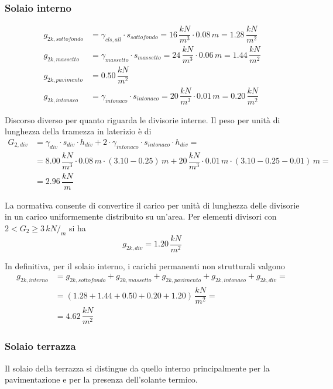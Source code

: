 \subsubsection*{Solaio interno}

\begin{align*}
 g_{2k, sottofondo} &= \gamma_{cls, all}\cdot s_{sottofondo} = 16\,\dfrac{kN}{m^3}\cdot 0.08\,\si{m} = 1.28\,\dfrac{kN}{m^2}\\
 g_{2k, massetto} &= \gamma_{massetto}\cdot
 s_{massetto} = 24\,\dfrac{kN}{m^3}\cdot 0.06\,\si{m} = 1.44\,\dfrac{kN}{m^2}\\
 g_{2k, pavimento} &= 0.50\,\dfrac{kN}{m^2}\\
 g_{2k, intonaco} &= \gamma_{intonaco}\cdot s_{intonaco} = 20\,\dfrac{kN}{m^3}\cdot 0.01\,\si{m} = 0.20\,\dfrac{kN}{m^2}
\end{align*}

Discorso diverso per quanto riguarda le divisorie interne. Il peso per unità di lunghezza della tramezza in laterizio è di 
\begin{align*}
 G_{2, div} &= \gamma_{div} \cdot s_{div} \cdot h_{div} + 2 \cdot \gamma_{intonaco} \cdot s_{intonaco} \cdot h_{div} =\\ &= 8.00\,\dfrac{kN}{m^3}\cdot 0.08\,\si{m} \cdot (3.10 - 0.25)\,\si{m} + 20\,\dfrac{kN}{m^3}\cdot 0.01\,\si{m} \cdot (3.10 - 0.25 - 0.01)\,\si{m}=\\ &= 2.96\,\dfrac{kN}{m}
 \end{align*}
 
 La normativa consente di convertire il carico per unità di lunghezza  delle divisorie in un carico uniformemente distribuito su un'area. Per elementi divisori con $2<G_2 \geq 3\,kN/_m$ si ha
 \[
  g_{2k, div} = 1.20\,\dfrac{kN}{m^2}
 \]
 
 In definitiva, per il solaio interno, i carichi permanenti non strutturali valgono
 \begin{align*}
	g_{2k, interno} &= g_{2k, sottofondo} + g_{2k, massetto} + g_{2k, pavimento} + g_{2k, intonaco} + g_{2k, div}=\\ &= (1.28 + 1.44 + 0.50 + 0.20 + 1.20)\,\dfrac{kN}{m^2} =\\&=
	4.62\,\dfrac{kN}{m^2}
 \end{align*}
 
 \subsubsection*{Solaio terrazza}
 Il solaio della terrazza si distingue da quello interno principalmente per la pavimentazione e per la presenza dell'solante termico.

